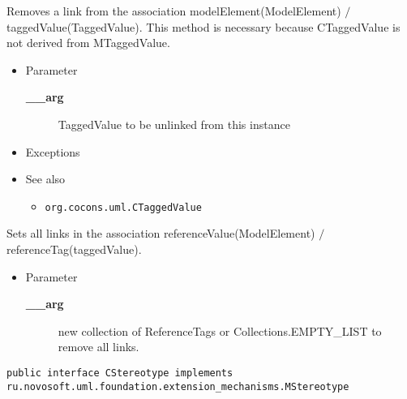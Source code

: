 \begin{desc}Removes a link from the association modelElement(ModelElement)
 $/$ taggedValue(TaggedValue).
 This method is necessary because CTaggedValue is not derived
 from MTaggedValue.
\begin{itemize}
\item{Parameter
  \begin{description}
   \item[{\bf \_\_arg}]{TaggedValue to be unlinked from this instance}
  \end{description}}
\end{itemize}
\begin{itemize}
\item{{Exceptions}
}
\item{{See also}
  \begin{itemize}
   \item{{\tt org.cocons.uml.CTaggedValue} {
}
}
  \end{itemize}
}
\end{itemize}
\end{desc}

\begin{desc}Sets all links in the association referenceValue(ModelElement)
  $/$ referenceTag(taggedValue).
\begin{itemize}
\item{Parameter
  \begin{description}
   \item[{\bf \_\_arg}]{new collection of ReferenceTags or Collections.EMPTY\_LIST to
        remove all links.}
  \end{description}}
\end{itemize}
\end{desc}


{\tt public interface
 CStereotype implements ru.novosoft.uml.foundation.extension\_mechanisms.MStereotype}


